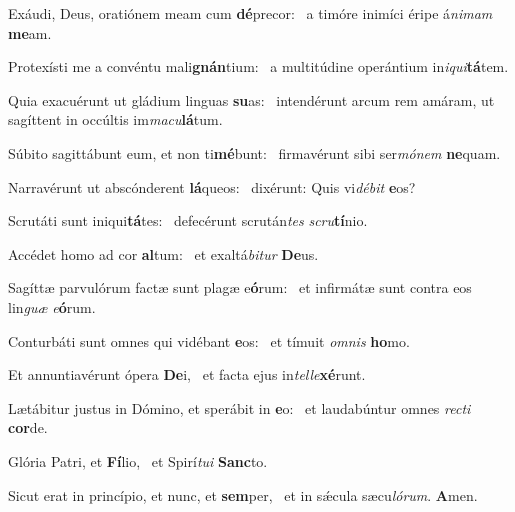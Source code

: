 \item Exáudi, Deus, oratiónem meam cum \textbf{dé}precor:~\psstar{} a timóre inimíci éripe á\textit{ni}\textit{mam} \textbf{me}am.
\item Protexísti me a convéntu mali\textbf{gnán}tium:~\psstar{} a multitúdine operántium in\textit{i}\textit{qui}\textbf{tá}tem.
\item Quia exacuérunt ut gládium linguas \textbf{su}as:~\psstar{} intendérunt arcum rem amáram, ut sagíttent in occúltis im\textit{ma}\textit{cu}\textbf{lá}tum.
\item Súbito sagittábunt eum, et non ti\textbf{mé}bunt:~\psstar{} firmavérunt sibi ser\textit{mó}\textit{nem} \textbf{ne}quam.
\item Narravérunt ut abscónderent \textbf{lá}queos:~\psstar{} dixérunt: Quis vi\textit{dé}\textit{bit} \textbf{e}os?
\item Scrutáti sunt iniqui\textbf{tá}tes:~\psstar{} defecérunt scrután\textit{tes} \textit{scru}\textbf{tí}nio.
\item Accédet homo ad cor \textbf{al}tum:~\psstar{} et exaltá\textit{bi}\textit{tur} \textbf{De}us.
\item Sagíttæ parvulórum factæ sunt plagæ e\textbf{ó}rum:~\psstar{} et infirmátæ sunt contra eos lin\textit{guæ} \textit{e}\textbf{ó}rum.
\item Conturbáti sunt omnes qui vidébant \textbf{e}os:~\psstar{} et tímuit \textit{om}\textit{nis} \textbf{ho}mo.
\item Et annuntiavérunt ópera \textbf{De}i,~\psstar{} et facta ejus in\textit{tel}\textit{le}\textbf{xé}runt.
\item Lætábitur justus in Dómino, et sperábit in \textbf{e}o:~\psstar{} et laudabúntur omnes \textit{rec}\textit{ti} \textbf{cor}de.
\item Glória Patri, et \textbf{Fí}lio,~\psstar{} et Spirí\textit{tu}\textit{i} \textbf{Sanc}to.
\item Sicut erat in princípio, et nunc, et \textbf{sem}per,~\psstar{} et in sǽcula sæcu\textit{ló}\textit{rum}. \textbf{A}men.
